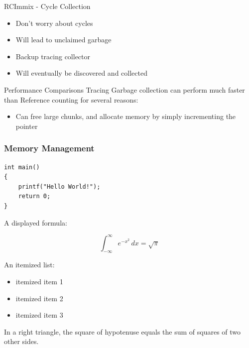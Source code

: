 \documentclass{beamer}
\begin{document}
\begin{frame}{RCImmix - Cycle Collection}
	\begin{itemize}
		\item Don't worry about cycles
		\item Will lead to unclaimed garbage
		\item Backup tracing collector
		\item Will eventually be discovered and collected
	\end{itemize}
\end{frame}

\begin{frame}{Performance Comparisons}
	Tracing Garbage collection can perform much faster than Reference counting for several reasons:
	\begin{itemize}
		\item Can free large chunks, and allocate memory by simply incrementing the pointer
	\end{itemize}

\end{frame}

\begin{frame}[fragile]
\frametitle{Memory Management}


\begin{lstlisting}[caption=First C example]
int main()
{
    printf("Hello World!");
    return 0;
}
\end{lstlisting}

A displayed formula:

\[
  \int_{-\infty}^\infty e^{-x^2} \, dx = \sqrt{\pi}
\]

An itemized list:

\begin{itemize}
  \item itemized item 1
  \item itemized item 2
  \item itemized item 3
\end{itemize}

\begin{theorem}
  In a right triangle, the square of hypotenuse equals
  the sum of squares of two other sides.
\end{theorem}

\end{frame}
\end{document}
